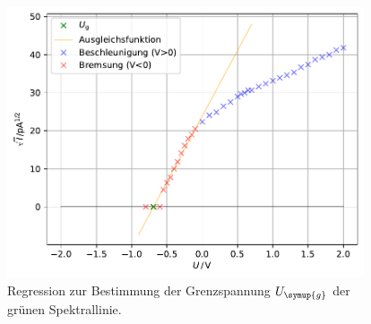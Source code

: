 \begin{figure}
    \centering
    \includegraphics[height = 8cm]{build/plotgruen.pdf}
    \caption{Regression zur Bestimmung der Grenzspannung $U_{\symup{g}}$ der grünen Spektrallinie.}
    \label{fig:gruen}
\end{figure}

